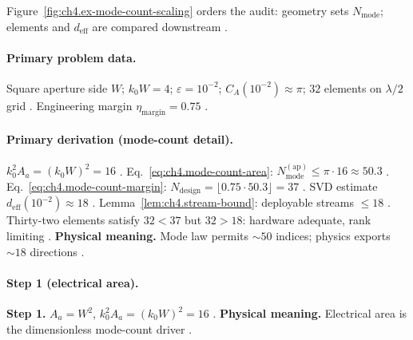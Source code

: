 Figure~\ref{fig:ch4.ex-mode-count-scaling} orders the audit: geometry sets \(N_{\mathrm{mode}}\); elements and \(d_{\mathrm{eff}}\) are compared downstream
\cite{hansen1988,harrington2001,stratton1941,devaney2004,collin2001,jackson1999}.

\paragraph{Primary problem data.}
Square aperture side \(W\); \(k_{0}W=4\); \(\varepsilon=10^{-2}\); \(C_{A}(10^{-2})\approx\pi\); \(32\) elements on \(\lambda/2\) grid
\cite{jackson1999,hansen1988,collin2001,harrington2001,stratton1941,devaney2004}. Engineering margin \(\eta_{\mathrm{margin}}=0.75\)
\cite{harrington2001,stratton1941,devaney2004,hansen1988,jackson1999,collin2001}.

\paragraph{Primary derivation (mode-count detail).}
\(k_{0}^{2}A_{a}=(k_{0}W)^{2}=16\) \cite{jackson1999,stratton1941,hansen1988,harrington2001,collin2001,devaney2004}. Eq.~\eqref{eq:ch4.mode-count-area}:
\(N_{\mathrm{mode}}^{\mathrm{(ap)}}\le\pi\cdot16\approx50.3\) \cite{hansen1988,collin2001,harrington2001,jackson1999,stratton1941,devaney2004}. Eq.~\eqref{eq:ch4.mode-count-margin}:
\(N_{\mathrm{design}}=\lfloor0.75\cdot50.3\rfloor=37\) \cite{harrington2001,devaney2004,collin2001,jackson1999,hansen1988,stratton1941}. SVD estimate \(d_{\mathrm{eff}}(10^{-2})\approx18\)
\cite{harrington2001,stratton1941,hansen1988,devaney2004,jackson1999,collin2001}. Lemma~\ref{lem:ch4.stream-bound}: deployable streams \(\le18\)
\cite{harrington2001,stratton1941,devaney2004,hansen1988,jackson1999,collin2001}. Thirty-two elements satisfy \(32<37\) but \(32>18\): hardware adequate, rank limiting
\cite{stratton1941,harrington2001,hansen1988,devaney2004,jackson1999,collin2001}.
\textbf{Physical meaning.} Mode law permits \(\sim50\) indices; physics exports \(\sim18\) directions \cite{harrington2001,stratton1941,hansen1988,devaney2004,jackson1999,collin2001}.

\paragraph{Step 1 (electrical area).}
\textbf{Step 1.} \(A_{a}=W^{2}\), \(k_{0}^{2}A_{a}=(k_{0}W)^{2}=16\) \cite{jackson1999,stratton1941,hansen1988,harrington2001}.
\textbf{Physical meaning.} Electrical area is the dimensionless mode-count driver \cite{collin2001,devaney2004}.

